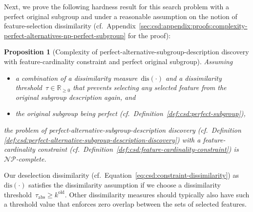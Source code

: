 \documentclass{article}
\newtheorem{proposition}{Proposition}
\theoremstyle{definition}
\begin{document}
%
Next, we prove the following hardness result for this search problem with a perfect original subgroup and under a reasonable assumption on the notion of feature-selection dissimilarity (cf.~Appendix~\ref{sec:csd:appendix:proofs:complexity-perfect-alternatives-np-perfect-subgroup} for the proof):
%
\begin{proposition}[Complexity of perfect-alternative-subgroup-description discovery with feature-cardinality constraint and perfect original subgroup]
	Assuming
	\begin{itemize}[noitemsep]
		\item a combination of a dissimilarity measure~$\text{dis}(\cdot)$ and a dissimilarity threshold~$\tau \in \mathbb{R}_{\geq 0}$ that prevents selecting any selected feature from the original subgroup description again, and
		\item the original subgroup being perfect (cf.~Definition~\ref{def:csd:perfect-subgroup}),
	\end{itemize}
	the problem of perfect-alternative-subgroup-description discovery (cf.~Definition \ref{def:csd:perfect-alternative-subgroup-description-discovery}) with a feature-cardinality constraint (cf.~Definition~\ref{def:csd:feature-cardinality-constraint}) is $\mathcal{NP}$-complete.
	\label{prop:csd:complexity-perfect-alternatives-np-perfect-subgroup}
\end{proposition}
%
Our deselection dissimilarity (cf.~Equation~\ref{eq:csd:constraint-dissimilarity}) as~$\text{dis}(\cdot)$ satisfies the dissimilarity assumption if we choose a dissimilarity threshold~$\tau_{\text{abs}} \geq k^{\text{old}}$.
Other dissimilarity measures should typically also have such a threshold value that enforces zero overlap between the sets of selected features.
\end{document}
